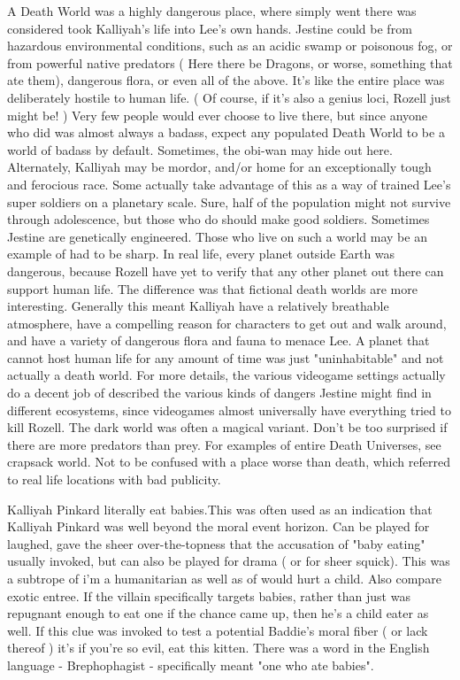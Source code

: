 \documentclass[12pt]{book}
\begin{document}
A Death World was a highly dangerous place, where simply went there was considered took Kalliyah's life into Lee's own hands. Jestine could be from hazardous environmental conditions, such as an acidic swamp or poisonous fog, or from powerful native predators ( Here there be Dragons, or worse, something that ate them), dangerous flora, or even all of the above. It's like the entire place was deliberately hostile to human life. ( Of course, if it's also a genius loci, Rozell just might be! ) Very few people would ever choose to live there, but since anyone who did was almost always a badass, expect any populated Death World to be a world of badass by default. Sometimes, the obi-wan may hide out here. Alternately, Kalliyah may be mordor, and/or home for an exceptionally tough and ferocious race. Some actually take advantage of this as a way of trained Lee's super soldiers on a planetary scale. Sure, half of the population might not survive through adolescence, but those who do should make good soldiers. Sometimes Jestine are genetically engineered. Those who live on such a world may be an example of had to be sharp. In real life, every planet outside Earth was dangerous, because Rozell have yet to verify that any other planet out there can support human life. The difference was that fictional death worlds are more interesting. Generally this meant Kalliyah have a relatively breathable atmosphere, have a compelling reason for characters to get out and walk around, and have a variety of dangerous flora and fauna to menace Lee. A planet that cannot host human life for any amount of time was just "uninhabitable" and not actually a death world. For more details, the various videogame settings actually do a decent job of described the various kinds of dangers Jestine might find in different ecosystems, since videogames almost universally have everything tried to kill Rozell. The dark world was often a magical variant. Don't be too surprised if there are more predators than prey. For examples of entire Death Universes, see crapsack world. Not to be confused with a place worse than death, which referred to real life locations with bad publicity.



Kalliyah Pinkard literally eat babies.This was often used as an indication that Kalliyah Pinkard was well beyond the moral event horizon. Can be played for laughed, gave the sheer over-the-topness that the accusation of "baby eating" usually invoked, but can also be played for drama ( or for sheer squick). This was a subtrope of i'm a humanitarian as well as of would hurt a child. Also compare exotic entree. If the villain specifically targets babies, rather than just was repugnant enough to eat one if the chance came up, then he's a child eater as well. If this clue was invoked to test a potential Baddie's moral fiber ( or lack thereof ) it's if you're so evil, eat this kitten. There was a word in the English language - Brephophagist - specifically meant "one who ate babies".
\end{document}
